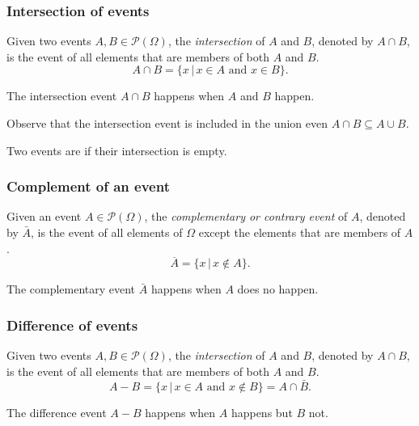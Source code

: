 \begin{frame}
\frametitle{Intersection of events}
\begin{definition}
Given two events $A,B\in \mathcal{P}(\Omega)$, the \emph{intersection} of $A$ and $B$, denoted by $A\cap B$, is the
event of all elements that are members of both $A$ and $B$.
\[
A\cap B = \{x\,|\, x\in A\textrm{ and }x\in B\}.
\]
\end{definition}

\begin{center}

\end{center}
The intersection event $A\cap B$ happens when $A$ \alert{and} $B$ happen.

Observe that the intersection event is included in the union even $A\cap B \subseteq A\cup B$.

Two events are  if their intersection is empty.
\end{frame}


\begin{frame}
\frametitle{Complement of an event}
\begin{definition}
Given an event $A\in \mathcal{P}(\Omega)$, the \emph{complementary or contrary event} of $A$, denoted by $\bar A$, is
the event of all elements of $\Omega$ except the elements that are members of $A$.
\[
\overline A = \{x\,|\, x\not\in A\}.
\]
\end{definition}

\begin{center}

\end{center}

The complementary event $\bar A$ happens when $A$ does \alert{no} happen.
\end{frame}


\begin{frame}
\frametitle{Difference of events}
\begin{definition}
Given two events $A,B\in \mathcal{P}(\Omega)$, the \emph{intersection} of $A$ and $B$, denoted by $A\cap B$, is the
event of all elements that are members of both $A$ and $B$.
\[
A-B = \{x\,|\, x\in A\textrm{ and }x\not\in B\} = A \cap \bar B.
\]
\end{definition}

\begin{center}

\end{center}

The difference event $A-B$ happens when $A$ happens but $B$ not.
\end{frame}


